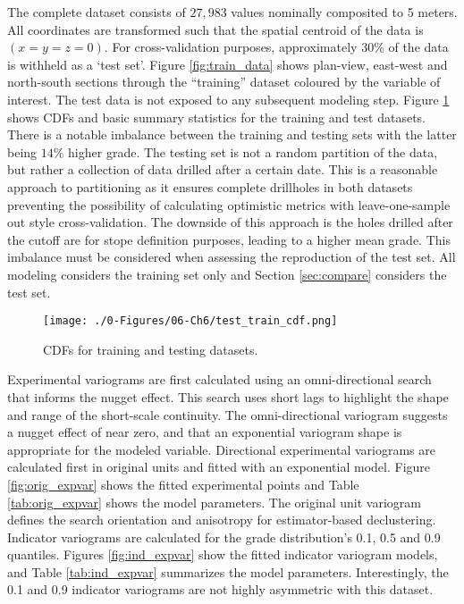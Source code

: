 The complete dataset consists of $27,983$ values nominally composited to 5 meters. All coordinates are transformed such that the spatial centroid of the data is $(x=y=z=0)$. For cross-validation purposes, approximately 30\% of the data is withheld as a `test set'. Figure \ref{fig:train_data} shows plan-view, east-west and north-south sections through the ``training'' dataset coloured by the variable of interest. The test data is not exposed to any subsequent modeling step. Figure \ref{fig:datasets} shows \glspl{CDF} and basic summary statistics for the training and test datasets. There is a notable imbalance between the training and testing  sets with the latter being $14\%$ higher grade. The testing set is not a random partition of the data, but rather a collection of data drilled after a certain date. This is a reasonable approach to partitioning as it ensures complete drillholes in both datasets preventing the possibility of calculating optimistic metrics with leave-one-sample out style cross-validation. The downside of this approach is the holes drilled after the cutoff are for stope definition purposes, leading to a higher mean grade. This imbalance must be considered when assessing the reproduction of the test set. All modeling considers the training set only and Section \ref{sec:compare} considers the test set.

\begin{figure}[htb!]
    \centering
    \texttt{[image: ./0-Figures/06-Ch6/test\_train\_cdf.png]}
    \caption{ \Glspl{CDF} for training and testing datasets. }
    \label{fig:datasets}
\end{figure}

Experimental variograms are first calculated using an omni-directional search that informs the nugget effect. This search uses short lags to highlight the shape and range of the short-scale continuity. The omni-directional variogram suggests a nugget effect of near zero, and that an exponential variogram shape is appropriate for the modeled variable. Directional experimental variograms are calculated first in original units and fitted with an exponential model. Figure \ref{fig:orig_expvar} shows the fitted experimental points and Table \ref{tab:orig_expvar} shows the model parameters. The original unit variogram defines the search orientation and anisotropy for estimator-based declustering. Indicator variograms are calculated for the grade distribution's 0.1, 0.5 and 0.9 quantiles. Figures \ref{fig:ind_expvar} show the fitted indicator variogram models, and Table \ref{tab:ind_expvar} summarizes the model parameters. Interestingly, the 0.1 and 0.9 indicator variograms are not highly asymmetric with this dataset.

